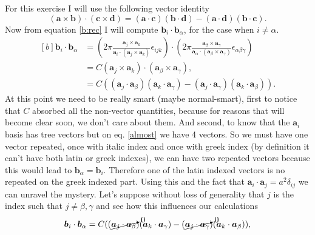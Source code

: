 \begin{questions}
\begin{solution}
\end{solution}
\begin{solution}
  For this exercise I will use the following vector identity
  \begin{equation}
    (\bm{a}\times \bm{b})\cdot (\bm{c}\times \bm{d}) = (\bm{a}\cdot\bm{c})(\bm{b}\cdot\bm{d}) - (\bm{a}\cdot\bm{d})(\bm{b}\cdot\bm{c}).
  \end{equation}
  Now from equation \ref{b:rec} I will compute $\bm{b}_i\cdot\bm{b}_{\alpha}$, for the case when $i\neq \alpha$.
  \begin{equation}
    \begin{aligned}[b]
      \bm{b}_i\cdot\bm{b}_\alpha &= \left(2\pi \frac{\bm{a}_j \times \bm{a}_k}{\bm{a}_i\cdot(\bm{a}_j \times \bm{a}_k)}\epsilon_{ijk}\right) \cdot\left(2\pi \frac{\bm{a}_\beta \times \bm{a}_\gamma}{\bm{a}_\alpha\cdot(\bm{a}_\beta \times \bm{a}_\gamma)}\epsilon_{\alpha\beta\gamma}\right)\\
      &= C (\bm{a}_j \times \bm{a}_k)\cdot(\bm{a}_\beta \times \bm{a}_\gamma),\\
      &= C ((\bm{a}_j\cdot\bm{a}_\beta)(\bm{a}_k\cdot\bm{a}_\gamma) - (\bm{a}_j\cdot\bm{a}_\gamma)(\bm{a}_k\cdot\bm{a}_\beta)).
    \end{aligned}
    \label{almost}
  \end{equation}
  At this point we need to be really smart (maybe normal-smart), first to notice that $C$ absorbed all the non-vector quantities, because for reasons that will become clear soon, we don't care about them. And second, to know that the $\bm{a}_i$ basis has tree vectors but on eq. \ref{almost} we have 4 vectors. So we must have one vector repeated, once with italic index and once with greek index (by definition it can't have both latin or greek indexes), we can have two repeated vectors because this would lead to $\bm{b}_\alpha = \bm{b}_i $. Therefore one of the latin indexed vectors is no repeated on the greek indexed part. Using this and the fact that $\bm{a}_i \cdot \bm{a}_j = a^2 \delta_{ij}$ we can unravel the mystery. Let's suppose without loss of generality that $j$ is the index such that $j\neq \beta, \gamma$ and see how this influences our calculations
  \begin{equation}
    \begin{aligned}[b]
       \bm{b}_i\cdot\bm{b}_\alpha &= C( (\cancelto{0}{\bm{a}_j\cdot\bm{a}_\beta})(\bm{a}_k\cdot\bm{a}_\gamma) - (\cancelto{0}{\bm{a}_j\cdot\bm{a}_\gamma})(\bm{a}_k\cdot\bm{a}_\beta)), \\

\end{aligned}
\end{equation}
\end{solution}
\end{questions}
